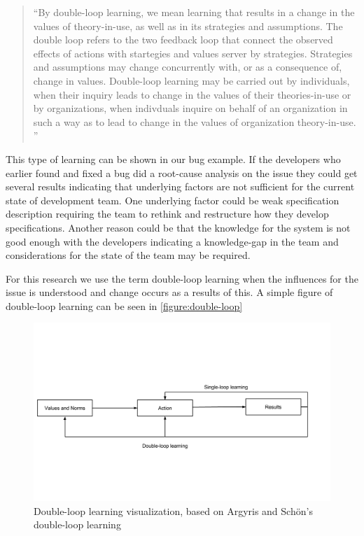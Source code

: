 \begin{quote}
``By double-loop learning, we mean learning that results in a change in the values of theory-in-use, as well as in its strategies and assumptions. The double loop refers to the two feedback loop that connect the observed effects of actions with startegies and values server by strategies. Strategies and assumptions may change concurrently with, or as a consequence of, change in values. Double-loop learning may be carried out by individuals, when their inquiry leads to change in the values of their theories-in-use or by organizations, when indivduals inquire on behalf of an organization in such a way as to lead to change in the values of organization theory-in-use. ''
\end{quote}

This type of learning can be shown in our bug example. If the developers who earlier found and fixed a bug did a root-cause analysis on the issue they could get several results indicating that underlying factors are not sufficient for the current state of development team. One underlying factor could be weak specification description requiring the team to rethink and restructure how they develop specifications. Another reason could be that the knowledge for the system is not good enough with the developers indicating a knowledge-gap in the team and considerations for the state of the team may be required. 

For this research we use the term double-loop learning when the influences for the issue is understood and change occurs as a results of this. A simple figure of double-loop learning can be seen in \autoref{figure:double-loop}

\begin{figure}[!h]
	\centering
	\includegraphics[width=\textwidth, keepaspectratio]{figures/double-loop.png}
	\caption{Double-loop learning visualization, based on Argyris and Schön's double-loop learning \cite{Argyris1996}}
	\label{figure:double-loop}
\end{figure}

